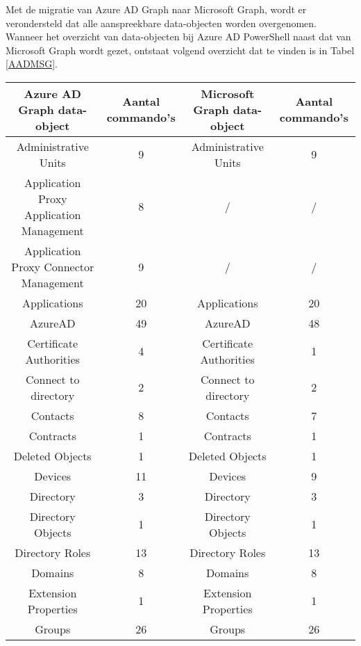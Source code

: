

Met de migratie van Azure \ac{AD} Graph naar Microsoft Graph, wordt er verondersteld dat alle aanspreekbare data-objecten worden overgenomen. Wanneer het overzicht van data-objecten bij Azure \ac{AD} PowerShell naast dat van Microsoft Graph wordt gezet, ontstaat volgend overzicht dat te vinden is in Tabel \ref{AADMSG}. \\

\begin{table}
    \centering
    \begin{adjustbox}{max width=\textwidth}
    \begin{tabular}{ |c|c||c|c| } 
        \hline
        \textbf{Azure AD Graph data-object} & \textbf{Aantal commando's} & \textbf{Microsoft Graph data-object} & \textbf{Aantal commando's} \\
        \hline
        Administrative Units & 9 & Administrative Units & 9 \\ 
        Application Proxy Application Management & 8 & / & / \\
        Application Proxy Connector Management & 9 & / & / \\
        Applications & 20 & Applications & 20 \\ 
        AzureAD & 49 & AzureAD & 48 \\ 
        Certificate Authorities & 4 & Certificate Authorities & 1 \\ 
        Connect to directory & 2 & Connect to directory & 2 \\ 
        Contacts & 8 & Contacts & 7 \\ 
        Contracts & 1 & Contracts & 1 \\ 
        Deleted Objects & 1 & Deleted Objects & 1 \\ 
        Devices & 11 & Devices & 9 \\    
        Directory & 3 & Directory & 3 \\
        Directory Objects & 1 & Directory Objects & 1 \\ 
        Directory Roles & 13 & Directory Roles & 13 \\ 
        Domains & 8 & Domains & 8 \\ 
        Extension Properties & 1 & Extension Properties & 1 \\ 
        Groups & 26 & Groups & 26 \\ 

\end{tabular}
\end{adjustbox}
\end{table}
